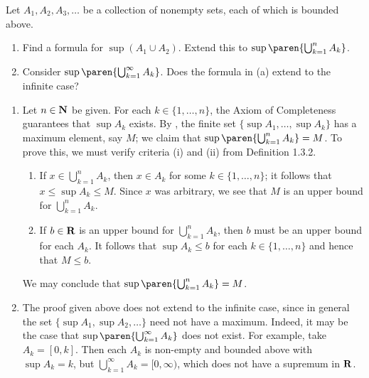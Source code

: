 \documentclass{lew98_solutions}
\begin{document}
\begin{exercise}
\label{ex:1.3.4}
    Let \( A_1, A_2, A_3, \ldots \) be a collection of nonempty sets, each of which is bounded above.
    \begin{enumerate}
        \item Find a formula for \( \sup (A_1 \cup A_2) \). Extend this to \( \sup \paren{ \bigcup_{k=1}^n A_k } \).

        \item Consider \( \sup \paren{ \bigcup_{k=1}^{\infty} A_k } \). Does the formula in (a) extend to the infinite case?
    \end{enumerate}
\end{exercise}

\begin{solution}
    \begin{enumerate}
        \item Let \( n \in \mathbf{N} \) be given. For each \( k \in \{ 1, \ldots, n \} \), the Axiom of Completeness guarantees that \( \sup A_k \) exists. By , the finite set \( \{ \sup A_1, \ldots, \sup A_k \} \) has a maximum element, say \( M \); we claim that \( \sup \paren{ \bigcup_{k=1}^n A_k } = M \). To prove this, we must verify criteria (i) and (ii) from Definition 1.3.2.
        \begin{enumerate}[label=(\roman*)]
            \item If \( x \in \bigcup_{k=1}^n A_k \), then \( x \in A_k \) for some \( k \in \{ 1, \ldots, n \} \); it follows that \( x \leq \sup A_k \leq M \). Since \( x \) was arbitrary, we see that \( M \) is an upper bound for \( \bigcup_{k=1}^n A_k \).

            \item If \( b \in \mathbf{R} \) is an upper bound for \( \bigcup_{k=1}^n A_k \), then \( b \) must be an upper bound for each \( A_k \). It follows that \( \sup A_k \leq b \) for each \( k \in \{ 1, \ldots, n \} \) and hence that \( M \leq b \).
        \end{enumerate}
        We may conclude that \( \sup \paren{ \bigcup_{k=1}^n A_k } = M \).

        \item The proof given above does not extend to the infinite case, since in general the set \( \{ \sup A_1, \sup A_2, \ldots \} \) need not have a maximum. Indeed, it may be the case that \( \sup \paren{ \bigcup_{k=1}^{\infty} A_k } \) does not exist. For example, take \( A_k = [0, k] \). Then each \( A_k \) is non-empty and bounded above with \( \sup A_k = k \), but \( \bigcup_{k=1}^{\infty} A_k = [0, \infty) \), which does not have a supremum in \( \mathbf{R} \).
    \end{enumerate}
\end{solution}
\end{document}
